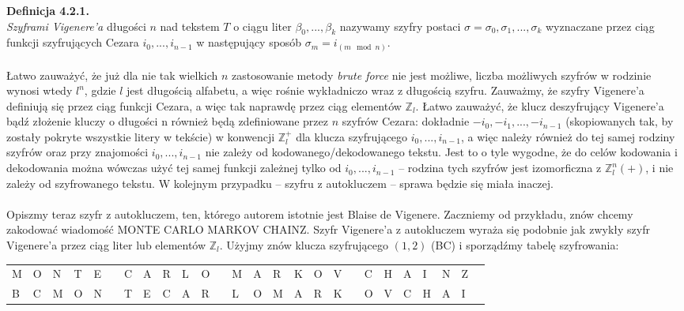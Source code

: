 \documentclass[a4paper]{article}
\begin{document}
\textbf{Definicja 4.2.1.}\\
\textit{Szyframi Vigenere'a} długości $n$ nad tekstem $T$ o ciągu liter $\beta_0, ..., \beta_k$ nazywamy szyfry postaci $\sigma = \sigma_0, \sigma_1, ..., \sigma_k$ wyznaczane przez ciąg funkcji szyfrujących Cezara $i_0, ..., i_{n-1}$ w następujący sposób $\sigma_m = i_{(m \mod n)}$.\\\\
Łatwo zauważyć, że już dla nie tak wielkich $n$ zastosowanie metody \textit{brute force} nie jest możliwe, liczba możliwych szyfrów w rodzinie wynosi wtedy $l^n$, gdzie $l$ jest długością alfabetu, a więc rośnie wykładniczo wraz z długością szyfru. Zauważmy, że szyfry Vigenere'a definiują się przez ciąg funkcji Cezara, a więc tak naprawdę przez ciąg elementów $\mathbb{Z}_l$. Łatwo zauważyć, że klucz deszyfrujący Vigenere'a bądź złożenie kluczy o długości n również będą zdefiniowane przez $n$ szyfrów Cezara: dokładnie $-i_0, -i_1, ..., -i_{n-1}$ (skopiowanych tak, by zostały pokryte wszystkie litery w tekście) w konwencji $\mathbb{Z}_l^+$ dla klucza szyfrującego $i_0, ..., i_{n-1}$, a więc należy również do tej samej rodziny szyfrów oraz przy znajomości $i_0, ..., i_{n-1}$ nie zależy od kodowanego/dekodowanego tekstu. Jest to o tyle wygodne, że do celów kodowania i dekodowania można wówczas użyć tej samej funkcji zależnej tylko od $i_0, ..., i_{n-1}$ – rodzina tych szyfrów jest izomorficzna z $\mathbb{Z}_l^n(+)$, i nie zależy od szyfrowanego tekstu. W kolejnym przypadku – szyfru z autokluczem – sprawa będzie się miała inaczej.\\\\
Opiszmy teraz szyfr z autokluczem, ten, którego autorem istotnie jest Blaise de Vigenere. Zaczniemy od przykładu, znów chcemy zakodować wiadomość MONTE CARLO MARKOV CHAINZ. Szyfr Vigenere'a z autokluczem wyraża się podobnie jak zwykły szyfr Vigenere'a przez ciąg liter lub elementów $\mathbb{Z}_l$. Użyjmy znów klucza szyfrującego $(1, 2)$ (BC) i sporządźmy tabelę szyfrowania:
\begin{center}\begin{tabular}{|p{1.5mm}|p{1.5mm}|p{1.5mm}|p{1.5mm}|p{1.5mm}|p{1.5mm}|p{1.5mm}|p{1.5mm}|p{1.5mm}|p{1.5mm}|p{1.5mm}|p{1.5mm}|p{1.5mm}|p{1.5mm}|p{1.5mm}|p{1.5mm}|p{1.5mm}|p{1.5mm}|p{1.5mm}|p{1.5mm}|p{1.5mm}|p{1.5mm}|p{1.5mm}|p{1.5mm}|p{1.5mm}|p{1.5mm}|}
    M & O & N & T & E & & C & A & R & L & O & & M & A & R & K & O & V & & C & H & A & I & N & Z \\
    B & C & M & O & N & & T & E & C & A & R & & L & O & M & A & R & K & & O & V & C & H & A & I
\end{tabular}
\end{center}
\end{document}
